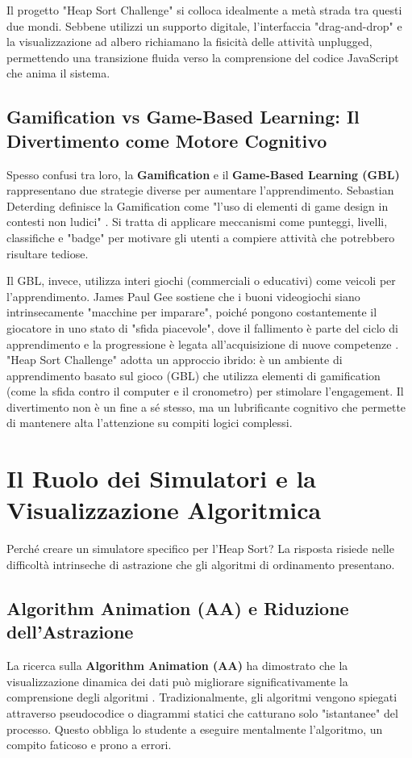 \documentclass[openany]{theme/uniprthesis}
\begin{document}
Il progetto "Heap Sort Challenge" si colloca idealmente a metà strada tra questi due mondi. Sebbene utilizzi un supporto digitale, l'interfaccia "drag-and-drop" e la visualizzazione ad albero richiamano la fisicità delle attività unplugged, permettendo una transizione fluida verso la comprensione del codice JavaScript che anima il sistema.

\subsection{Gamification vs Game-Based Learning: Il Divertimento come Motore Cognitivo}
Spesso confusi tra loro, la \textbf{Gamification} e il \textbf{Game-Based Learning (GBL)} rappresentano due strategie diverse per aumentare l'apprendimento. Sebastian Deterding definisce la Gamification come "l'uso di elementi di game design in contesti non ludici" \cite{deterding2011}. Si tratta di applicare meccanismi come punteggi, livelli, classifiche e "badge" per motivare gli utenti a compiere attività che potrebbero risultare tediose.

Il GBL, invece, utilizza interi giochi (commerciali o educativi) come veicoli per l'apprendimento. James Paul Gee sostiene che i buoni videogiochi siano intrinsecamente "macchine per imparare", poiché pongono costantemente il giocatore in uno stato di "sfida piacevole", dove il fallimento è parte del ciclo di apprendimento e la progressione è legata all'acquisizione di nuove competenze \cite{gee2003video}. "Heap Sort Challenge" adotta un approccio ibrido: è un ambiente di apprendimento basato sul gioco (GBL) che utilizza elementi di gamification (come la sfida contro il computer e il cronometro) per stimolare l'engagement. Il divertimento non è un fine a sé stesso, ma un lubrificante cognitivo che permette di mantenere alta l'attenzione su compiti logici complessi.

\section{Il Ruolo dei Simulatori e la Visualizzazione Algoritmica}
Perché creare un simulatore specifico per l'Heap Sort? La risposta risiede nelle difficoltà intrinseche di astrazione che gli algoritmi di ordinamento presentano.

\subsection{Algorithm Animation (AA) e Riduzione dell'Astrazione}
La ricerca sulla \textbf{Algorithm Animation (AA)} ha dimostrato che la visualizzazione dinamica dei dati può migliorare significativamente la comprensione degli algoritmi \cite{hundhausen2002meta}. Tradizionalmente, gli algoritmi vengono spiegati attraverso pseudocodice o diagrammi statici che catturano solo "istantanee" del processo. Questo obbliga lo studente a eseguire mentalmente l'algoritmo, un compito faticoso e prono a errori.
\end{document}
